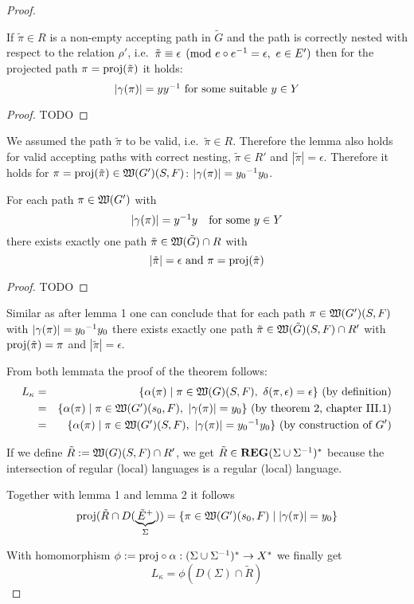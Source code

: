 \begin{proof}
\begin{lemma}
If $\tilde{\pi} \in R$ is a non-empty accepting path in $\tilde{G}$ and the
path is correctly nested with respect to the relation $\rho'$, i.e.\ 
$\tilde{\pi} \equiv \epsilon \pmod{e\circ \mbox{${e}^{-1}$} = \epsilon,\ e\in E'}$
then for the projected path $\pi = \mathrm{proj}({\tilde{\pi}})$ it holds:
\[ |\gamma(\pi)| = y \mbox{${y}^{-1}$}\text{ for some suitable }y \in Y \]
\end{lemma}

\begin{proof}
TODO
\end{proof}

We assumed the path $\tilde{\pi}$ to be valid, i.e.\ $\tilde{\pi} \in R$.
Therefore the lemma also holds for valid accepting paths with correct nesting,
$\tilde{\pi} \in R'$ and $|\tilde{\pi}| = \epsilon$. Therefore it holds for
$\pi = \mathrm{proj}({\tilde{\pi}}) \in \mbox{$\mathfrak{W}({G'})$}(S, F)$: $|\gamma(\pi)| = \mbox{${y_0}^{-1}$}
y_0$.

\bigskip
\begin{lemma}
For each path $\pi \in \mbox{$\mathfrak{W}({G'})$}$ with
\[ |\gamma(\pi)| = \mbox{${y}^{-1}$} y \quad\text{for some }y \in Y \]
there exists exactly one path $\tilde{\pi} \in \mbox{$\mathfrak{W}({\tilde{G}})$} \cap R$ with
\[ |\tilde{\pi}| = \epsilon\text{ and }\pi = \mathrm{proj}({\tilde{\pi}}) \] 
\end{lemma}

\begin{proof}
TODO
\end{proof}

Similar as after lemma 1 one can conclude that for each path $\pi \in
\mbox{$\mathfrak{W}({G'})$}(S, F)$ with $|\gamma(\pi)| = \mbox{${y_0}^{-1}$}y_0$ there exists exactly one
path $\tilde{\pi} \in \mbox{$\mathfrak{W}({\tilde{G}})$}(S, F) \cap R'$ with
$\mathrm{proj}({\tilde{\pi}}) = \pi$ and $|\tilde{\pi}| = \epsilon$.

From both lemmata the proof of the theorem follows:
\begin{eqnarray*}
L_\kappa &=& \setof{\alpha(\pi) \mid \pi \in \pathcat{G}(S, F),\ \delta(\pi,
\epsilon) = \epsilon}\text{ (by definition)} \\
&=& \setof{\alpha(\pi) \mid \pi \in \pathcat{G'}(s_0, F),\ |\gamma(\pi)| =
y_0}\text{ (by theorem 2, chapter III.1)} \\
&=& \setof{\alpha(\pi) \mid \pi \in \pathcat{G'}(S, F),\
|\gamma(\pi)| = \inv{y_0} y_0}\text{ (by construction of $G'$)}
\end{eqnarray*}

If we define $\tilde{R} := \mbox{$\mathfrak{W}({G})$}(S, F) \cap R'$, we get $\tilde{R} \in
\mbox{{\bf REG}}(\Sigma \cup {\Sigma}^{-1})^*$ because the intersection of regular (local)
languages is a regular (local) language.

Together with lemma 1 and lemma 2 it follows
\[ \mathrm{proj}({\tilde{R} \cap D(\underbrace{\tilde{E}^+}_{\Sigma})}) = \mbox{$\{\pi \in
\mbox{$\mathfrak{W}({G'})$}(s_0, F) \mid |\gamma(\pi)| = y_0\}$} \]

With homomorphism $\phi := \mathrm{proj} \circ \alpha : (\Sigma \cup {\Sigma}^{-1})^*
\to X^*$ we finally get
\[ L_\kappa = \phi(D(\Sigma) \cap \tilde{R}) \]
\end{proof}

